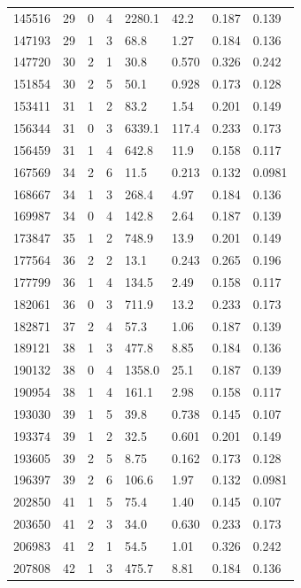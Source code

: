 \documentclass[preview]{standalone}
\begin{document}
{{{\begin{tabular}{L{1.2cm}C{1.2cm} C{0.3cm}C{0.5cm} C{1.4cm}C{1.4cm} C{1.4cm}C{1.4cm}}
  145516  &    29  & 0     &  4 &  2280.1  & 42.2  & 0.187 &  0.139   \\ 
  147193  &    29  & 1     &  3 &  68.8  & 1.27  & 0.184 &  0.136   \\ 
  147720  &    30  & 2     &  1 &  30.8  & 0.570  & 0.326 &  0.242   \\ 
  151854  &    30  & 2     &  5 &  50.1  & 0.928  & 0.173 &  0.128   \\ 
  153411  &    31  & 1     &  2 &  83.2  & 1.54  & 0.201 &  0.149   \\ 
  156344  &    31  & 0     &  3 &  6339.1  & 117.4  & 0.233 &  0.173   \\ 
  156459  &    31  & 1     &  4 &  642.8  & 11.9  & 0.158 &  0.117   \\ 
  167569  &    34  & 2     &  6 &  11.5  & 0.213  & 0.132 &  0.0981   \\ 
  168667  &    34  & 1     &  3 &  268.4  & 4.97  & 0.184 &  0.136   \\ 
  169987  &    34  & 0     &  4 &  142.8  & 2.64  & 0.187 &  0.139   \\ 
  173847  &    35  & 1     &  2 &  748.9  & 13.9  & 0.201 &  0.149   \\ 
  177564  &    36  & 2     &  2 &  13.1  & 0.243  & 0.265 &  0.196   \\ 
  177799  &    36  & 1     &  4 &  134.5  & 2.49  & 0.158 &  0.117   \\ 
  182061  &    36  & 0     &  3 &  711.9  & 13.2  & 0.233 &  0.173   \\ 
  182871  &    37  & 2     &  4 &  57.3  & 1.06  & 0.187 &  0.139   \\ 
  189121  &    38  & 1     &  3 &  477.8  & 8.85  & 0.184 &  0.136   \\ 
  190132  &    38  & 0     &  4 &  1358.0  & 25.1  & 0.187 &  0.139   \\ 
  190954  &    38  & 1     &  4 &  161.1  & 2.98  & 0.158 &  0.117   \\ 
  193030  &    39  & 1     &  5 &  39.8  & 0.738  & 0.145 &  0.107   \\ 
  193374  &    39  & 1     &  2 &  32.5  & 0.601  & 0.201 &  0.149   \\ 
  193605  &    39  & 2     &  5 &  8.75  & 0.162  & 0.173 &  0.128   \\ 
  196397  &    39  & 2     &  6 &  106.6  & 1.97  & 0.132 &  0.0981   \\ 
  202850  &    41  & 1     &  5 &  75.4  & 1.40  & 0.145 &  0.107   \\ 
  203650  &    41  & 2     &  3 &  34.0  & 0.630  & 0.233 &  0.173   \\ 
  206983  &    41  & 2     &  1 &  54.5  & 1.01  & 0.326 &  0.242   \\ 
  207808  &    42  & 1     &  3 &  475.7  & 8.81  & 0.184 &  0.136   \\ 
\hline 
\end{tabular} 

}}}
\end{document}
